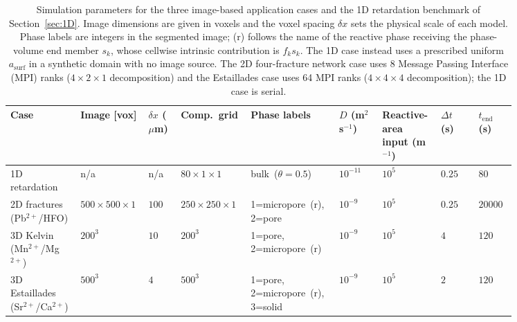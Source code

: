 \begin{table}[htbp]
    \centering
    \caption{Simulation parameters for the three image-based application cases
    and the 1D retardation benchmark of Section~\ref{sec:1D}. Image dimensions
    are given in voxels and the voxel spacing $\delta x$ sets the physical scale
    of each model. Phase labels are integers in the segmented image; (r)
    follows the name of the reactive phase receiving the phase-volume end
    member $s_k$, whose cellwise intrinsic contribution is $f_k s_k$. The 1D
    case instead uses a prescribed uniform $a_{\mathrm{surf}}$ in a synthetic
    domain with no image source.
    The 2D four-fracture network case uses 8 Message Passing Interface (MPI)
    ranks
    ($4\times2\times1$ decomposition) and the Estaillades case uses 64 MPI ranks
    ($4\times4\times4$ decomposition); the 1D case is serial.}
    \label{tab:simParams}
    \scriptsize
    \setlength{\tabcolsep}{2pt}
    \begin{tabular}{@{}p{0.13\linewidth}p{0.09\linewidth}p{0.06\linewidth}p{0.09\linewidth}p{0.16\linewidth}p{0.08\linewidth}p{0.10\linewidth}p{0.07\linewidth}p{0.07\linewidth}@{}}
        \toprule
        Case
            & Image [vox]
            & $\delta x$ ($\mu$m)
            & Comp.\ grid
            & Phase labels
            & $D$ (m$^{2}$\,s$^{-1}$)
            & Reactive-area input (m$^{-1}$)
            & $\Delta t$ (s)
            & $t_{\mathrm{end}}$ (s) \\
        \midrule
        1D retardation
            & n/a
            & n/a
            & $80\times1\times1$
            & \mbox{bulk ($\theta=0.5$)}
            & $10^{-11}$
            & $10^{5}$
            & $0.25$
            & $80$ \\
        2D fractures (Pb$^{2+}$/HFO)
            & $500\times500\times1$
            & $100$
            & $250\times250\times1$
            & 1=\mbox{micropore (r)}, 2=pore
            & $10^{-9}$
            & $10^{5}$
            & $0.25$
            & $20000$ \\
        3D Kelvin (Mn$^{2+}$/Mg$^{2+}$)
            & $200^{3}$
            & $10$
            & $200^{3}$
            & 1=pore, 2=\mbox{micropore (r)}
            & $10^{-9}$
            & $10^{5}$
            & $4$
            & $120$ \\
        3D Estaillades (Sr$^{2+}$/Ca$^{2+}$)
            & $500^{3}$
            & $4$
            & $500^{3}$
            & 1=pore, 2=\mbox{micropore (r)}, 3=solid
            & $10^{-9}$
            & $10^{5}$
            & $2$
            & $120$ \\
        \bottomrule
    \end{tabular}
\end{table}


